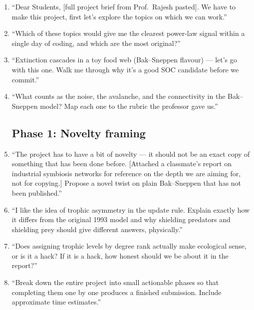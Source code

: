 \documentclass[11pt,a4paper]{article}
\begin{document}
\begin{enumerate}
\item ``Dear Students, [full project brief from Prof.\ Rajesh pasted]. We have to make this project, first let's explore the topics on which we can work.''
\item ``Which of these topics would give me the clearest power-law signal within a single day of coding, and which are the most original?''
\item ``Extinction cascades in a toy food web (Bak--Sneppen flavour) --- let's go with this one. Walk me through why it's a good SOC candidate before we commit.''
\item ``What counts as the noise, the avalanche, and the connectivity in the Bak--Sneppen model? Map each one to the rubric the professor gave us.''

\subsection*{Phase 1: Novelty framing}
\item ``The project has to have a bit of novelty --- it should not be an exact copy of something that has been done before. [Attached a classmate's report on industrial symbiosis networks for reference on the depth we are aiming for, not for copying.] Propose a novel twist on plain Bak--Sneppen that has not been published.''
\item ``I like the idea of trophic asymmetry in the update rule. Explain exactly how it differs from the original 1993 model and why shielding predators and shielding prey should give different answers, physically.''
\item ``Does assigning trophic levels by degree rank actually make ecological sense, or is it a hack? If it is a hack, how honest should we be about it in the report?''
\item ``Break down the entire project into small actionable phases so that completing them one by one produces a finished submission. Include approximate time estimates.''


\end{enumerate}
\end{document}
